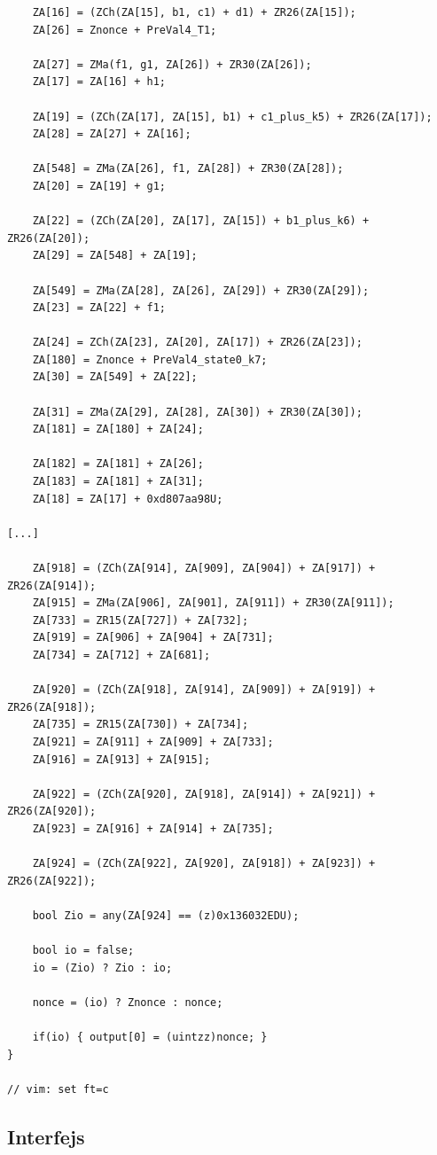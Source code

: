 \documentclass[11pt,a4paper]{article}
\begin{document}
\begin{verbatim}
	ZA[16] = (ZCh(ZA[15], b1, c1) + d1) + ZR26(ZA[15]);
	ZA[26] = Znonce + PreVal4_T1;

	ZA[27] = ZMa(f1, g1, ZA[26]) + ZR30(ZA[26]);
	ZA[17] = ZA[16] + h1;

	ZA[19] = (ZCh(ZA[17], ZA[15], b1) + c1_plus_k5) + ZR26(ZA[17]);
	ZA[28] = ZA[27] + ZA[16];

	ZA[548] = ZMa(ZA[26], f1, ZA[28]) + ZR30(ZA[28]);
	ZA[20] = ZA[19] + g1;

	ZA[22] = (ZCh(ZA[20], ZA[17], ZA[15]) + b1_plus_k6) + ZR26(ZA[20]);
	ZA[29] = ZA[548] + ZA[19];

	ZA[549] = ZMa(ZA[28], ZA[26], ZA[29]) + ZR30(ZA[29]);
	ZA[23] = ZA[22] + f1;

	ZA[24] = ZCh(ZA[23], ZA[20], ZA[17]) + ZR26(ZA[23]);
	ZA[180] = Znonce + PreVal4_state0_k7;
	ZA[30] = ZA[549] + ZA[22];

	ZA[31] = ZMa(ZA[29], ZA[28], ZA[30]) + ZR30(ZA[30]);
	ZA[181] = ZA[180] + ZA[24];

	ZA[182] = ZA[181] + ZA[26];
	ZA[183] = ZA[181] + ZA[31];
	ZA[18] = ZA[17] + 0xd807aa98U;
	
[...]

	ZA[918] = (ZCh(ZA[914], ZA[909], ZA[904]) + ZA[917]) + ZR26(ZA[914]);
	ZA[915] = ZMa(ZA[906], ZA[901], ZA[911]) + ZR30(ZA[911]);
	ZA[733] = ZR15(ZA[727]) + ZA[732];
	ZA[919] = ZA[906] + ZA[904] + ZA[731];
	ZA[734] = ZA[712] + ZA[681];

	ZA[920] = (ZCh(ZA[918], ZA[914], ZA[909]) + ZA[919]) + ZR26(ZA[918]);
	ZA[735] = ZR15(ZA[730]) + ZA[734];
	ZA[921] = ZA[911] + ZA[909] + ZA[733];
	ZA[916] = ZA[913] + ZA[915];

	ZA[922] = (ZCh(ZA[920], ZA[918], ZA[914]) + ZA[921]) + ZR26(ZA[920]);
	ZA[923] = ZA[916] + ZA[914] + ZA[735];

	ZA[924] = (ZCh(ZA[922], ZA[920], ZA[918]) + ZA[923]) + ZR26(ZA[922]);

	bool Zio = any(ZA[924] == (z)0x136032EDU);

	bool io = false;
	io = (Zio) ? Zio : io;

	nonce = (io) ? Znonce : nonce;

	if(io) { output[0] = (uintzz)nonce; }
}

// vim: set ft=c
    \end{verbatim}  
\endgroup

\subsection{Interfejs}
\end{document}
